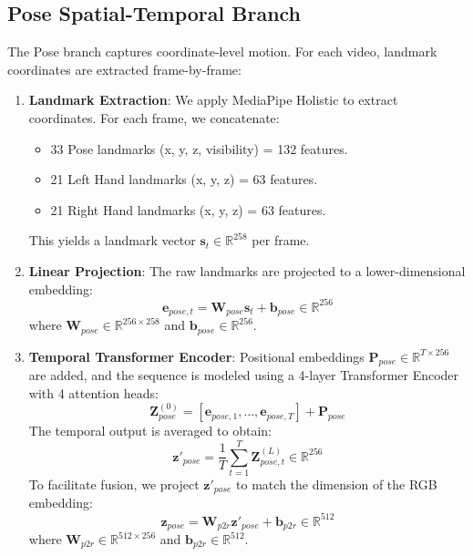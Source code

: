 \documentclass[conference]{IEEEtran}
\begin{document}
\subsection{Pose Spatial-Temporal Branch}
The Pose branch captures coordinate-level motion. For each video, landmark coordinates are extracted frame-by-frame:
\begin{enumerate}
    \item \textbf{Landmark Extraction}: We apply MediaPipe Holistic to extract coordinates. For each frame, we concatenate:
    \begin{itemize}
        \item 33 Pose landmarks (x, y, z, visibility) = 132 features.
        \item 21 Left Hand landmarks (x, y, z) = 63 features.
        \item 21 Right Hand landmarks (x, y, z) = 63 features.
    \end{itemize}
    This yields a landmark vector $\mathbf{s}_t \in \mathbb{R}^{258}$ per frame.
    \item \textbf{Linear Projection}: The raw landmarks are projected to a lower-dimensional embedding:
    \begin{equation}
        \mathbf{e}_{pose, t} = \mathbf{W}_{pose} \mathbf{s}_t + \mathbf{b}_{pose} \in \mathbb{R}^{256}
    \end{equation}
    where $\mathbf{W}_{pose} \in \mathbb{R}^{256 \times 258}$ and $\mathbf{b}_{pose} \in \mathbb{R}^{256}$.
    \item \textbf{Temporal Transformer Encoder}: Positional embeddings $\mathbf{P}_{pose} \in \mathbb{R}^{T \times 256}$ are added, and the sequence is modeled using a 4-layer Transformer Encoder with 4 attention heads:
    \begin{equation}
        \mathbf{Z}_{pose}^{(0)} = [\mathbf{e}_{pose, 1}, \dots, \mathbf{e}_{pose, T}] + \mathbf{P}_{pose}
    \end{equation}
    The temporal output is averaged to obtain:
    \begin{equation}
        \mathbf{z}'_{pose} = \frac{1}{T} \sum_{t=1}^T \mathbf{Z}_{pose, t}^{(L)} \in \mathbb{R}^{256}
    \end{equation}
    To facilitate fusion, we project $\mathbf{z}'_{pose}$ to match the dimension of the RGB embedding:
    \begin{equation}
        \mathbf{z}_{pose} = \mathbf{W}_{p2r} \mathbf{z}'_{pose} + \mathbf{b}_{p2r} \in \mathbb{R}^{512}
    \end{equation}
    where $\mathbf{W}_{p2r} \in \mathbb{R}^{512 \times 256}$ and $\mathbf{b}_{p2r} \in \mathbb{R}^{512}$.
\end{enumerate}
\end{document}
